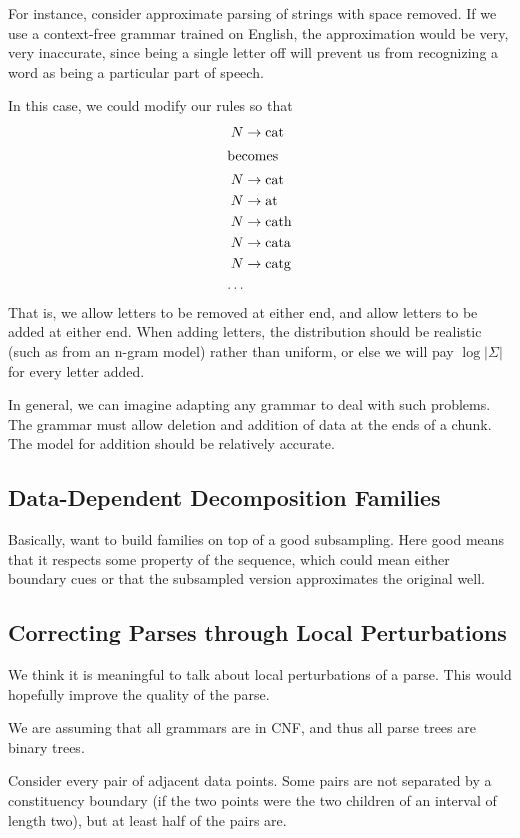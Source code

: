 For instance, consider approximate parsing of strings with space
removed. If we use a context-free grammar trained on English, the
approximation would be very, very inaccurate, since being a single
letter off will prevent us from recognizing a word as being a
particular part of speech.

In this case, we could modify our rules so that
\begin{align*}
N &\to \mbox{cat} \\
\intertext{becomes}
N &\to \mbox{cat} \\
N &\to \mbox{at} \\
N &\to \mbox{cath} \\
N &\to \mbox{cata} \\
N &\to \mbox{catg} \\
\ldots
\end{align*}
That is, we allow letters to be removed at either end, and allow
letters to be added at either end. When adding letters, the
distribution should be realistic (such as from an n-gram model) rather
than uniform, or else we will pay $\log|\Sigma|$ for every letter
added.

In general, we can imagine adapting any grammar to deal with such
problems. The grammar must allow deletion and addition of data at the
ends of a chunk. The model for addition should be relatively accurate.

\subsection{Data-Dependent Decomposition Families}

Basically, want to build families on top of a good subsampling. Here
good means that it respects some property of the sequence, which could
mean either boundary cues or that the subsampled version approximates
the original well.

\subsection{Correcting Parses through Local Perturbations}

We think it is meaningful to talk about local perturbations of a
parse. This would hopefully improve the quality of the parse.

We are assuming that all grammars are in CNF, and thus all parse trees
are binary trees.

Consider every pair of adjacent data points. Some pairs are not
separated by a constituency boundary (if the two points were the two
children of an interval of length two), but at least half of the pairs
are. 

